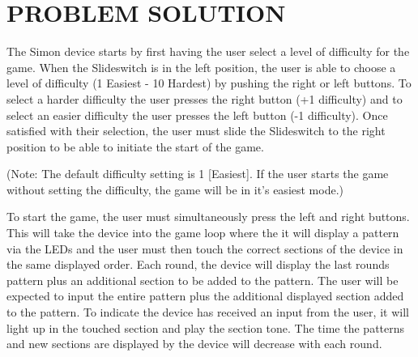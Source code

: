 \documentclass[12pt]{article}
\begin{document}
\section{PROBLEM SOLUTION}

The Simon device starts by first having the user select a level of difficulty for the game.  When the Slideswitch is in the left position, the user is able to choose a level of difficulty (1 Easiest - 10 Hardest) by pushing the right or left buttons.  To select a harder difficulty the user presses the right button (+1 difficulty) and to select an easier difficulty the user presses the left button (-1 difficulty).  Once satisfied with their selection, the user must slide the Slideswitch to the right position to be able to initiate the start of the game.

(Note: The default difficulty setting is 1 [Easiest].  If the user starts the game without setting the difficulty, the game will be in it's easiest mode.)

To start the game, the user must simultaneously press the left and right buttons.  This will take the device into the game loop where the it will display a pattern via the LEDs and the user must then touch the correct sections of the device in the same displayed order.  Each round, the device will display the last rounds pattern plus an additional section to be added to the pattern.  The user will be expected to input the entire pattern plus the additional displayed section added to the pattern.  To indicate the device has received an input from the user, it will light up in the touched section and play the section tone.  The time the patterns and new sections are displayed by the device will decrease with each round.\\
\end{document}
